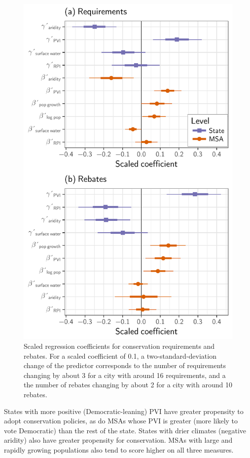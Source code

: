 \documentclass[draft,linenumbers]{agujournal}\usepackage{knitr}
\begin{document}
\begin{figure}[tbp]

{\centering \includegraphics[width=0.8\linewidth]{figure/req_reb_cat_plot-1}

}

\caption[Scaled regression coefficients for conservation requirements and rebates]{Scaled regression coefficients for conservation requirements and rebates. For a scaled coefficient of 0.1, a two-standard-deviation change of the predictor corresponds to the number of requirements changing by about 3 for a city with around 16 requirements, and a the number of rebates changing by about 2 for a city with around 10 rebates.}\label{fig:req_reb_cat_plot}
\end{figure}


%
%

%
%


States with more positive (Democratic-leaning) PVI have greater propensity to adopt conservation policies, as do MSAs whose PVI is greater (more likely to vote Democratic) than the rest of the state. States with drier climates (negative aridity)
also have greater propensity for conservation. MSAs with large and rapidly growing populations also tend to score higher on all three measures.
\end{document}
